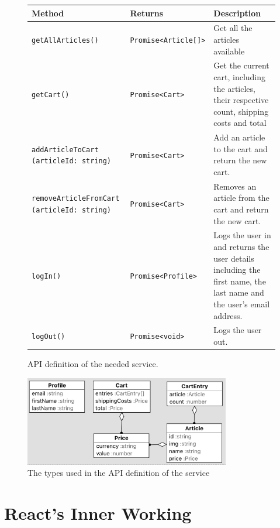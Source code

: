\begin{figure}[h!]
    \small
    \centering
    \begin{tabular}{||p{4cm} p{3.5cm} p{6cm}||}
        \hline
         Method & Returns & Description \\ [0.5ex]
        \hline\hline

        \texttt{getAllArticles()} & \texttt{Promise<Article[]>} & Get all the articles available \\
        \texttt{getCart()} & \texttt{Promise<Cart>} & Get the current cart, including the articles, their respective count, shipping costs and total \\
        \texttt{addArticleToCart (articleId: string)} & \texttt{Promise<Cart>} & Add an article to the cart and return the new cart. \\
        \texttt{removeArticleFromCart (articleId: string)} & \texttt{Promise<Cart>} & Removes an article from the cart and return the new cart. \\
        \texttt{logIn()} & \texttt{Promise<Profile>} & Logs the user in and returns the user details including the first name, the last name and the user’s email address. \\
        \texttt{logOut()} & \texttt{Promise<void>} & Logs the user out. \\ [1ex]
        \hline
    \end{tabular}
\caption{API definition of the needed service.}
\label{table_service_api}
\end{figure}

\begin{figure}[h!]
    \centering
    \includegraphics[width=0.8\textwidth]{images/class_diagram}
    \caption{The types used in the API definition of the service}
    \label{image_class_diagram}
\end{figure}

\clearpage
\hypertarget{reacts-inner-functionality}{%
\section{React's
Inner Working}\label{reacts-inner-functionality}}

